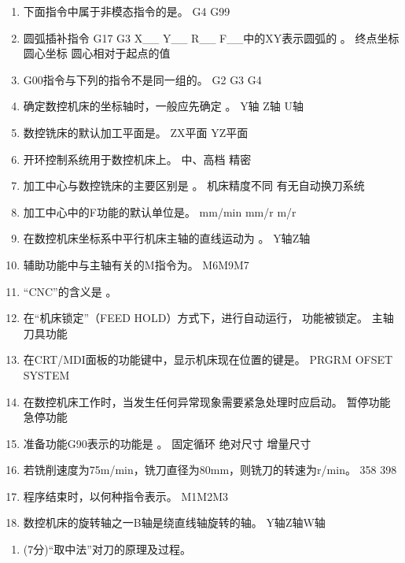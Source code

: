 \documentclass[12pt,twocolumn,landscape,UTF8,twoside]{ctexart}
\begin{document}
\begin{spacing}{1}
\begin{enumerate} [1.]
\item 下面指令中属于非模态指令的是。
	{G4}	{G99}
\item 圆弧插补指令 G17 G3 X\_\_ Y\_\_ R\_\_ F\_\_中的XY表示圆弧的	。
	{终点坐标}	{圆心坐标}	{圆心相对于起点的值}
\item G00指令与下列的指令不是同一组的。
		{G2}	{G3}	{G4}
\item 确定数控机床的坐标轴时，一般应先确定	。
	{Y轴} {Z轴}		{U轴}
\item 数控铣床的默认加工平面是。
		{ZX平面}		{YZ平面}		
\item 开环控制系统用于数控机床上。
		{中、高档}		{精密}
\item 加工中心与数控铣床的主要区别是	。
	{机床精度不同}	{有无自动换刀系统}
\item 加工中心中的F功能的默认单位是。
	{mm/min}	{mm/r}	{m/r}
\item 在数控机床坐标系中平行机床主轴的直线运动为	。
	{Y轴}{Z轴}
\item 辅助功能中与主轴有关的M指令为。
 {M6}{M9}{M7}
\item “CNC”的含义是	。
\item 在“机床锁定”（FEED HOLD）方式下，进行自动运行，	功能被锁定。
	{主轴} {刀具功能}
\item 在CRT/MDI面板的功能键中，显示机床现在位置的键是。
	{PRGRM}	{OFSET}	{SYSTEM}
\item 在数控机床工作时，当发生任何异常现象需要紧急处理时应启动。
	{暂停功能}	{急停功能}
\item 准备功能G90表示的功能是	。
	{固定循环}	{绝对尺寸}	{增量尺寸}
\item 若铣削速度为75m/min，铣刀直径为80mm，则铣刀的转速为r/min。
	{358}	{398}
\item 程序结束时，以何种指令表示。
	{M1}{M2}{M3}
\item 数控机床的旋转轴之一B轴是绕直线轴旋转的轴。
	{Y轴}{Z轴}{W轴}
\end{enumerate}
\begin{enumerate} [1.]
\item (7分)“取中法”对刀的原理及过程。
\end{enumerate}
\end{spacing}
\end{document}
